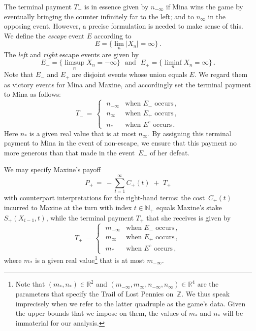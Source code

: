 \documentclass[letterpaper,11pt,oneside,reqno]{amsbook}
\newcommand{\N}{\ensuremath{\mathbb{N}}}
\newcommand{\R}{\ensuremath{\mathbb{R}}}
\newcommand{\Z}{\ensuremath{\mathbb{Z}}}
\numberwithin{figure}{chapter}
\theoremstyle{definition}
\theoremstyle{definition}
\theoremstyle{definition}
\theoremstyle{definition}
\theoremstyle{definition}
\newcommand{\nwithoutzero}{\N_+}
\def\hfff#1{\label{#1}}
\begin{document}
The terminal payment $T_-$ is in essence given by $n_{-\infty}$ if Mina wins the game by eventually bringing the counter infinitely far to the left; and to $n_\infty$ in the opposing event. However, a precise formulation is needed to make sense of this. We define the {\em escape} event $E$ according to 
\begin{equation}\label{e.escape}
E = \big\{ \lim_n \vert X_n \vert = \infty \big\} \, .
\end{equation}
The {\em left} and {\em right}  escape events\hfff{escape} are given by
\begin{equation}\label{e.leftrightescape}
E_- =  \big\{ \limsup_n X_n  = - \infty \big\} \, \, \, \, \textrm{and} \, \, \, \, 
E_+ =  \big\{ \liminf_n X_n  =  \infty \big\}   \, . 
\end{equation}
 Note that $E_-$ and $E_+$ are disjoint events whose union equals $E$. We regard them as victory events for Mina and Maxine, and accordingly set the terminal payment to Mina as follows:
 \begin{equation}\label{e.terminalmina}
  T_- \, = \, \begin{cases}
  \, \, n_{-\infty}  &  \text{when $E_-$ occurs} \, , \\
 \, \, n_\infty  &  \text{when $E_+$ occurs} \, , \\ 
   \, \, n_*  &  \text{when $E^c$ occurs} 
  \, .
\end{cases}
\end{equation}
Here $n_*$ is a given real value that is at most $n_\infty$. By assigning this terminal payment to Mina in the event of non-escape, we ensure that this payment no more generous than that made in the event~$E_+$ of her defeat.

We may specify Maxine's payoff\hfff{receiptmaxine} 
\begin{equation}\label{e.maxinepayoff}
 P_+ \, = \,  - \sum_{t = 1}^\infty C_+(t) \,  \, + \, \, T_+  
\end{equation}
with counterpart interpretations for the right-hand terms:
 the cost~$C_+(t)$ incurred to Maxine at the turn with index $t \in \nwithoutzero$ equals Maxine's stake $S_+(X_{t-1},t)$, while
 the terminal payment  $T_+$ that she receives is given by   
 \begin{equation}\label{e.terminalmaxine}
  T_+ \, = \, \begin{cases}
  \, \,  m_{-\infty}  &  \text{when $E_-$ occurs} \, , \\
 \, \,  m_\infty  &  \text{when $E_+$ occurs} \, , \\ 
   \, \, m_*  &  \text{when $E^c$ occurs}  \, ,
\end{cases}
 \end{equation}
where $m_*$ is a given real value\footnote{Note that $(m_*,n_*) \in \R^2$ and $(m_{-\infty},m_\infty,n_{-\infty},n_\infty) \in \R^4$ are the parameters that specify the Trail of Lost Pennies on~$\Z$. We thus speak imprecisely when we refer to the latter quadruple as the game's data. Given the upper bounds that we impose on them, the values of $m_*$ and $n_*$ will be immaterial for our analysis.} that is at most $m_{-\infty}$.
\end{document}
